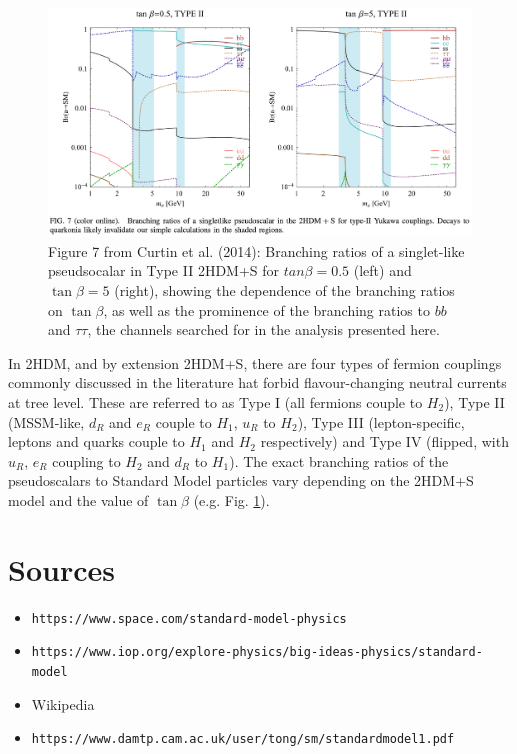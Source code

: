 \documentclass{article}
\begin{document}
\begin{figure}[ht]
    \centering
    \includegraphics[width=15cm]{figures/curtin-2014-figure-7-BRs-of-singlelike-pseudoscalar-type-II.png}
    \caption{Figure 7 from Curtin et al. (2014): Branching ratios of a singlet-like pseudsocalar in Type II 2HDM+S for $tan\beta = 0.5$ (left) and $\tan\beta = 5$ (right), showing the dependence of the branching ratios on $\tan\beta$, as well as the prominence of the branching ratios to $bb$ and $\tau\tau$, the channels searched for in the analysis presented here.}
    \label{fig:curtin-2014-fig-4-typeI-BRs}
\end{figure}


In 2HDM, and by extension 2HDM+S, there are four types of fermion couplings commonly discussed in the literature hat forbid flavour-changing neutral currents at tree level. These are referred to as Type I (all fermions couple to $H_2$), Type II (MSSM-like, $d_R$ and $e_R$ couple to $H_1$, $u_R$ to $H_2$), Type III (lepton-specific, leptons and quarks couple to $H_1$ and $H_2$ respectively) and Type IV (flipped, with $u_R$, $e_R$ coupling to $H_2$ and $d_R$ to $H_1$). The exact branching ratios of the pseudoscalars to Standard Model particles vary depending on the 2HDM+S model and the value of $\tan\beta$ (e.g. Fig. \ref{fig:curtin-2014-fig-4-typeI-BRs}).


\section{Sources}

    \begin{itemize}
        \item \texttt{https://www.space.com/standard-model-physics}
        \item \texttt{https://www.iop.org/explore-physics/big-ideas-physics/standard-model}
        \item Wikipedia
        \item \texttt{https://www.damtp.cam.ac.uk/user/tong/sm/standardmodel1.pdf}
    \end{itemize}
\end{document}
